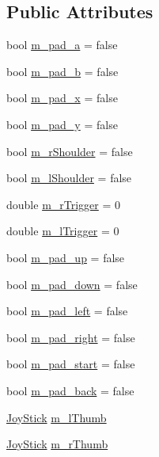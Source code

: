 \subsection*{Public Attributes}
\begin{DoxyCompactItemize}
\item 
bool \mbox{\hyperlink{class_gamepad_state_a4360b58651730ba3093aeb7e230d7b9c}{m\+\_\+pad\+\_\+a}} = false
\item 
bool \mbox{\hyperlink{class_gamepad_state_aeb8dbdc12eff1998bb5e4c7939ee8d4d}{m\+\_\+pad\+\_\+b}} = false
\item 
bool \mbox{\hyperlink{class_gamepad_state_a7b4d363af337e91dbca8a635d1e7c162}{m\+\_\+pad\+\_\+x}} = false
\item 
bool \mbox{\hyperlink{class_gamepad_state_a44288865f197563ba94aa0d0c6c91a4b}{m\+\_\+pad\+\_\+y}} = false
\item 
bool \mbox{\hyperlink{class_gamepad_state_a8770545348789e39666d7c24efc3d81a}{m\+\_\+r\+Shoulder}} = false
\item 
bool \mbox{\hyperlink{class_gamepad_state_a6848e841711aba17a09c77a631540411}{m\+\_\+l\+Shoulder}} = false
\item 
double \mbox{\hyperlink{class_gamepad_state_a7fda49285c96e6ebfb2ff859d8f49d25}{m\+\_\+r\+Trigger}} = 0
\item 
double \mbox{\hyperlink{class_gamepad_state_aacc840244feaa549971b77ba4d136b2f}{m\+\_\+l\+Trigger}} = 0
\item 
bool \mbox{\hyperlink{class_gamepad_state_ad203372d3b10484c5ced247c222ebcd8}{m\+\_\+pad\+\_\+up}} = false
\item 
bool \mbox{\hyperlink{class_gamepad_state_a387f485b532e7a31ea56509c6f0a5157}{m\+\_\+pad\+\_\+down}} = false
\item 
bool \mbox{\hyperlink{class_gamepad_state_ac17a62abf3c1fdd3aa26b788232d3870}{m\+\_\+pad\+\_\+left}} = false
\item 
bool \mbox{\hyperlink{class_gamepad_state_a6e16eab8479f7980d71fd7eb13891af6}{m\+\_\+pad\+\_\+right}} = false
\item 
bool \mbox{\hyperlink{class_gamepad_state_acbe87e934e620e58da1c10eed9a5007d}{m\+\_\+pad\+\_\+start}} = false
\item 
bool \mbox{\hyperlink{class_gamepad_state_ac2690b3db3e5a80a7ebc632cb0fac628}{m\+\_\+pad\+\_\+back}} = false
\item 
\mbox{\hyperlink{struct_gamepad_state_1_1_joy_stick}{Joy\+Stick}} \mbox{\hyperlink{class_gamepad_state_ac8ac567ef0b3c961b1406d3867692f5e}{m\+\_\+l\+Thumb}}
\item 
\mbox{\hyperlink{struct_gamepad_state_1_1_joy_stick}{Joy\+Stick}} \mbox{\hyperlink{class_gamepad_state_a03e27d5da92668c65855206e525734c9}{m\+\_\+r\+Thumb}}
\end{DoxyCompactItemize}


